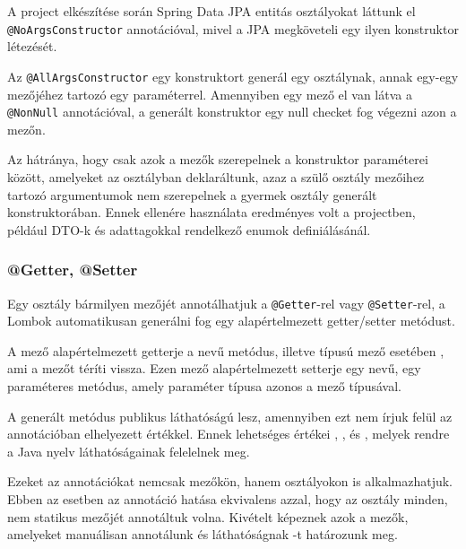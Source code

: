 
A project elkészítése során Spring Data JPA entitás osztályokat láttunk el \lstinline|@NoArgsConstructor| annotációval, mivel a JPA megköveteli egy ilyen konstruktor létezését. \par


Az \lstinline|@AllArgsConstructor| egy konstruktort generál egy osztálynak, annak egy-egy mezőjéhez tartozó egy paraméterrel. Amennyiben egy mező el van látva a \lstinline|@NonNull| annotációval, a generált konstruktor egy null checket fog végezni azon a mezőn.


Az  hátránya, hogy csak azok a mezők szerepelnek a konstruktor paraméterei között, amelyeket az osztályban deklaráltunk, azaz a szülő osztály mezőihez tartozó argumentumok nem szerepelnek a gyermek osztály generált konstruktorában. Ennek ellenére használata eredményes volt a projectben, például DTO-k és adattagokkal rendelkező enumok definiálásánál.


\subsubsection{@Getter, @Setter}

Egy osztály bármilyen mezőjét annotálhatjuk a  \lstinline|@Getter|-rel vagy \lstinline|@Setter|-rel, a Lombok automatikusan generálni fog egy alapértelmezett getter/setter metódust. \par

A  mező alapértelmezett getterje a  nevű metódus, illetve  típusú mező esetében , ami a  mezőt téríti vissza. Ezen mező alapértelmezett setterje egy  nevű, egy paraméteres metódus, amely paraméter típusa azonos a mező típusával. \par

A generált metódus publikus láthatóságú lesz, amennyiben ezt nem írjuk felül az annotációban elhelyezett  értékkel. Ennek lehetséges értékei , ,  és , melyek rendre a Java nyelv láthatóságainak felelelnek meg. \par

Ezeket az annotációkat nemcsak mezőkön, hanem osztályokon is alkalmazhatjuk. Ebben az esetben az annotáció hatása ekvivalens azzal, hogy az osztály minden, nem statikus mezőjét annotáltuk volna. Kivételt képeznek azok a mezők, amelyeket manuálisan annotálunk és láthatóságnak -t határozunk meg. \par

